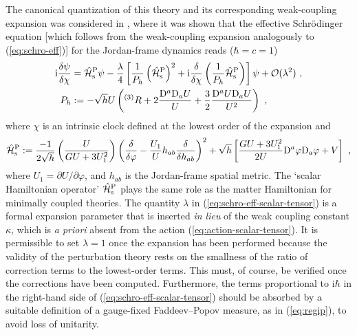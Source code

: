 \documentclass[12pt]{iopart}
\def\eq#1{\begin{equation}\begin{aligned}#1\end{aligned}\end{equation}}
\def\eref#1{(\ref{eq:#1})}
\def\I{\mathrm{i}}
\def\Ob{\mathcal{O}}
\begin{document}
The canonical quantization of this theory and its corresponding weak-coupling expansion was considered in \citet{Steinwachs:2017ihd,Steinwachs:2019rsl,vanderWild:2019lah}, where it was shown that the effective Schr\"odinger equation [which follows from the weak-coupling expansion analogously to \eref{schro-eff}] for the Jordan-frame dynamics reads ($\hbar = c = 1$)
\eq{\label{eq:schro-eff-scalar-tensor}
\I\frac{\delta\psi}{\delta\chi}&=\hat{\mathcal{H}}_{\rm s}^{\mathrm{P}}\psi-\frac{\lambda}{4}\left[\frac{1}{P_{h}}\left(\hat{\mathcal{H}}_{\rm s}^{\mathrm{P}}\right)^2 
+\I\frac{\delta}{\delta\chi}\left(\frac{1}{P_h}\hat{\mathcal{H}}_{\rm s}^{\mathrm{P}}\right)\right]\psi+\Ob(\lambda^2)\ ,\\
P_{h} &:=-\sqrt{h}U\left(^{(3)}R+2\frac{\mathrm{D}^a\mathrm{D}_a U}{U}+\frac32 \frac{\mathrm{D}^aU\mathrm{D}_aU}{U^2}\right) \ ,
}
where $\chi$ is an intrinsic clock defined at the lowest order of the expansion and
\eq{
\hat{\mathcal{H}}_{\rm s}^{\mathrm{P}} := \frac{-1}{2\sqrt{h}}\left(\frac{U}{GU+3U_1^2}\right)\left(\frac{\delta}{\delta\varphi}-\frac{U_1}{U}h_{ab}\frac{\delta}{\delta h_{ab}}\right)^2+\sqrt{h}\left[\frac{GU+3U_1^2}{2U}\mathrm{D}^a\varphi\mathrm{D}_a\varphi+V\right] \ ,
}
where $U_1 = \partial U/\partial\varphi$, and $h_{ab}$ is the Jordan-frame spatial metric. The `scalar Hamiltonian operator' $\hat{\mathcal{H}}_{\rm s}^{\mathrm{P}}$ plays the same role as the matter Hamiltonian for minimally coupled theories. The quantity $\lambda$ in \eref{schro-eff-scalar-tensor} is a formal expansion parameter that is inserted \emph{in lieu} of the weak coupling constant $\kappa$, which is \emph{a priori} absent from the action \eref{action-scalar-tensor}. It is permissible to set $\lambda=1$ once the expansion has been performed because the validity of the perturbation theory rests on the smallness of the ratio of correction terms to the lowest-order terms. This must, of course, be verified once the corrections have been computed. Furthermore, the terms proportional to $\I\hbar$ in the right-hand side of \eref{schro-eff-scalar-tensor} should be absorbed by a suitable definition of a gauge-fixed Faddeev--Popov measure, as in \eref{regip}, to avoid loss of unitarity.
\end{document}
